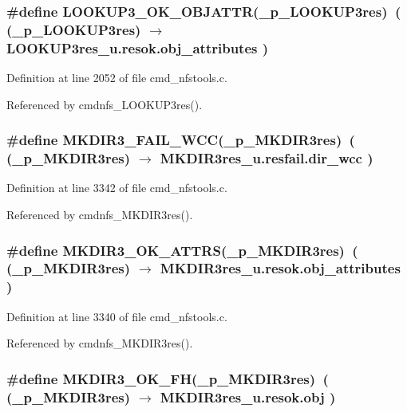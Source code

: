 \subsubsection{\setlength{\rightskip}{0pt plus 5cm}\#define LOOKUP3\_\-OK\_\-OBJATTR(\_\-p\_\-LOOKUP3res)\ ( (\_\-p\_\-LOOKUP3res) $\rightarrow$ LOOKUP3res\_\-u.resok.obj\_\-attributes )}\label{cmd__nfstools_8c_a10}




Definition at line 2052 of file cmd\_\-nfstools.c.

Referenced by cmdnfs\_\-LOOKUP3res().
\subsubsection{\setlength{\rightskip}{0pt plus 5cm}\#define MKDIR3\_\-FAIL\_\-WCC(\_\-p\_\-MKDIR3res)\ ( (\_\-p\_\-MKDIR3res) $\rightarrow$ MKDIR3res\_\-u.resfail.dir\_\-wcc )}\label{cmd__nfstools_8c_a32}




Definition at line 3342 of file cmd\_\-nfstools.c.

Referenced by cmdnfs\_\-MKDIR3res().
\subsubsection{\setlength{\rightskip}{0pt plus 5cm}\#define MKDIR3\_\-OK\_\-ATTRS(\_\-p\_\-MKDIR3res)\ ( (\_\-p\_\-MKDIR3res) $\rightarrow$ MKDIR3res\_\-u.resok.obj\_\-attributes )}\label{cmd__nfstools_8c_a30}




Definition at line 3340 of file cmd\_\-nfstools.c.

Referenced by cmdnfs\_\-MKDIR3res().
\subsubsection{\setlength{\rightskip}{0pt plus 5cm}\#define MKDIR3\_\-OK\_\-FH(\_\-p\_\-MKDIR3res)\ ( (\_\-p\_\-MKDIR3res) $\rightarrow$ MKDIR3res\_\-u.resok.obj )}\label{cmd__nfstools_8c_a29}




